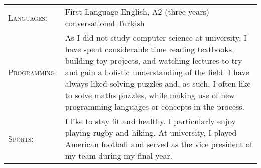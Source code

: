 \documentclass[a4paper,10pt]{article} %
\begin{document}
\begin{tabular}{p{3cm}p{15cm}}
\textsc{Languages:} & First Language English, A2 (three years) conversational Turkish\\

\textsc{Programming:} & As I did not study computer science at university, I have spent considerable time reading textbooks, building toy projects, and watching lectures to try and gain a holistic understanding of the field. I have always liked solving puzzles and, as such, I often like to solve maths puzzles, while making use of new programming languages or concepts in the process. \\

\textsc{Sports:} & I like to stay fit and healthy. I particularly enjoy playing rugby and hiking. At university, I played American football and served as the vice president of my team during my final year.\\
\end{tabular}


\end{document}
